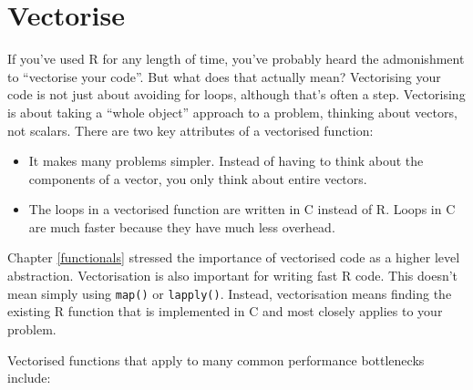 \documentclass[]{book}
\begin{document}
\hypertarget{vectorise}{%
\section{Vectorise}\label{vectorise}}


If you've used R for any length of time, you've probably heard the admonishment to ``vectorise your code''. But what does that actually mean? Vectorising your code is not just about avoiding for loops, although that's often a step. Vectorising is about taking a ``whole object'' approach to a problem, thinking about vectors, not scalars. There are two key attributes of a vectorised function:

\begin{itemize}
\item
  It makes many problems simpler. Instead of having to think about the
  components of a vector, you only think about entire vectors.
\item
  The loops in a vectorised function are written in C instead of R. Loops in C
  are much faster because they have much less overhead.
\end{itemize}

Chapter \ref{functionals} stressed the importance of vectorised code as a higher level abstraction. Vectorisation is also important for writing fast R code. This doesn't mean simply using \texttt{map()} or \texttt{lapply()}. Instead, vectorisation means finding the existing R function that is implemented in C and most closely applies to your problem.

Vectorised functions that apply to many common performance bottlenecks include:
\end{document}
